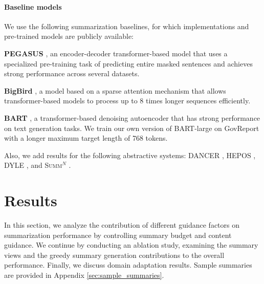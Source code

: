 \documentclass[11pt,table]{article}
\newenvironment{itemizesquish}[2]{\begin{list}{\labelitemi}{\setlength{\itemsep}{#1}\setlength{\labelwidth}{#2}\setlength{\leftmargin}{\labelwidth}\addtolength{\leftmargin}{\labelsep}}}{\end{list}}
\begin{document}
\paragraph{Baseline models}
We use the following summarization baselines, for which implementations and pre-trained models are publicly available:
\begin{itemizesquish}{-0.3em}{0.5em}
    \item \textbf{PEGASUS} \citep{zhang2020pegasus}, an encoder-decoder transformer-based model that uses a specialized pre-training task of predicting entire masked sentences and achieves strong performance across several datasets.
    \item \textbf{BigBird} \citep{zaheer2020big}, a model based on a sparse attention mechanism that allows transformer-based models to process up to 8 times longer sequences efficiently.
    \item \textbf{BART} \citep{lewis2019bart}, a transformer-based denoising autoencoder that has strong performance on text generation tasks. We train our own version of BART-large on GovReport with a longer maximum target length of 768 tokens.
\end{itemizesquish}
Also, we add results for the following abstractive systems: DANCER \citep{gidiotis2020divide}, HEPOS \citep{huang2021efficient}, DYLE \citep{mao_dyle_2022}, and \textsc{Summ$^N$} \citep{zhang_summn_2022}.

\section{Results}
\label{sec:results}
In this section, we analyze the contribution of different guidance factors on summarization performance by controlling summary budget and content guidance. We continue by conducting an ablation study, examining the summary views and the greedy summary generation contributions to the overall performance. Finally, we discuss domain adaptation results. Sample summaries are provided in Appendix \ref{sec:sample_summaries}.
\end{document}
